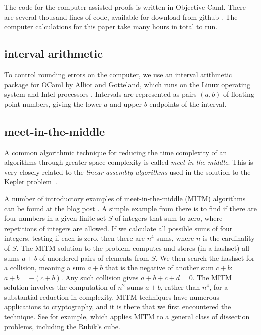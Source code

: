   The code for the computer-assisted proofs is written in Objective
  Caml.  There are several thousand lines of code, available for
  download from github \cite{Git}.  The computer calculations for this
  paper take many hours in total to run.  

\subsection{interval arithmetic}

To control
  rounding errors on the computer, we use an interval arithmetic
  package for OCaml by Alliot and Gotteland, which runs on the Linux
  operating system and Intel processors \cite{All}.  Intervals are represented as 
  pairs $(a,b)$ of floating point numbers, giving the lower $a$ and upper $b$ endpoints
of the interval. 



\subsection{meet-in-the-middle}

A common algorithmic technique for reducing the time complexity of an algorithms
through greater space complexity is called {\it meet-in-the-middle}.  This is very closely related to
the  {\it linear assembly algorithms} used in the solution to the Kepler problem~\cite{hales2003some}.

A number of introductory examples of meet-in-the-middle (MITM) algorithms can be found
at the blog post \cite{mitm}.
A simple example from there is to find if there are four numbers in a given finite set $S$ of integers
that sum to zero, where repetitions of integers are allowed.  
If we calculate all possible sums of four integers, testing if each is zero,
then there are $n^4$ sums, where $n$ is the cardinality of $S$.  The MITM solution to
the problem  computes and stores (in a hashset) all sums $a+b$ of unordered pairs of elements from $S$.
We then search the hashset for a collision, meaning a sum $a+b$ that is the negative of another sum $c+b$:
$a+b = -(c+b)$.
Any such collision gives $a+b+c+d=0$.  The MITM solution involves the computation of
$n^2$ sums $a+b$, rather than $n^4$, for a substantial reduction in complexity.  
MITM techniques have numerous applications to
cryptography, and it is there that we first encountered the technique.  See for example,
\cite{dinur2014dissection}
which applies MITM to a general class of dissection problems, including the Rubik's cube.


